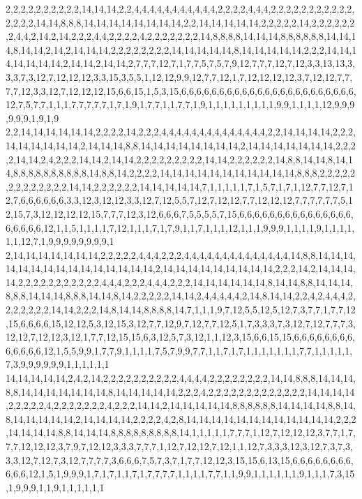 2,2,2,2,2,2,2,2,2,2,14,14,14,2,2,4,4,4,4,4,4,4,4,4,4,4,2,2,2,2,4,4,4,2,2,2,2,2,2,2,2,2,2,2,2,2,2,2,14,14,8,8,8,14,14,14,14,14,14,14,14,2,2,14,14,14,14,14,2,2,2,2,2,14,2,2,2,2,2,2,2,4,4,2,14,2,14,2,2,2,4,4,2,2,2,2,4,2,2,2,2,2,2,2,14,8,8,8,8,14,14,14,8,8,8,8,8,8,14,14,14,8,14,14,2,14,2,14,14,14,2,2,2,2,2,2,2,2,14,14,14,14,14,8,14,14,14,14,14,2,2,2,14,14,14,14,14,14,14,2,14,14,2,14,14,2,7,7,7,12,7,1,7,7,5,7,5,7,9,12,7,7,7,12,7,12,3,3,13,13,3,3,3,7,3,12,7,12,12,12,3,3,15,3,5,5,1,12,12,9,9,12,7,7,12,1,7,12,12,12,12,3,7,12,12,7,7,7,7,12,3,3,12,7,12,12,12,15,6,6,15,1,5,3,15,6,6,6,6,6,6,6,6,6,6,6,6,6,6,6,6,6,6,6,6,6,6,6,12,7,5,7,7,1,1,1,7,7,7,7,7,1,7,1,9,1,7,7,1,1,7,7,1,9,1,1,1,1,1,1,1,1,1,9,9,1,1,1,1,12,9,9,9,9,9,9,1,9,1,9
2,2,14,14,14,14,14,14,2,2,2,2,14,2,2,2,4,4,4,4,4,4,4,4,4,4,4,4,4,4,2,2,14,14,14,14,2,2,2,14,14,14,14,14,14,2,14,14,14,8,8,14,14,14,14,14,14,14,14,2,14,14,14,14,14,14,14,2,2,2,2,14,14,2,4,2,2,2,14,14,2,14,14,2,2,2,2,2,2,2,2,2,14,14,2,2,2,2,2,2,14,8,8,14,14,8,14,14,8,8,8,8,8,8,8,8,8,8,14,8,8,14,2,2,2,2,14,14,14,14,14,14,14,14,14,14,14,8,8,8,2,2,2,2,2,2,2,2,2,2,2,2,2,14,14,2,2,2,2,2,2,14,14,14,14,14,7,1,1,1,1,1,7,1,5,7,1,7,1,12,7,7,12,7,12,7,6,6,6,6,6,6,3,3,12,3,12,12,3,3,12,7,12,5,5,7,12,7,12,12,7,7,12,12,12,7,7,7,7,7,7,5,12,15,7,3,12,12,12,12,15,7,7,7,12,3,12,6,6,6,7,5,5,5,5,7,15,6,6,6,6,6,6,6,6,6,6,6,6,6,6,6,6,6,6,6,6,12,1,1,5,1,1,1,1,7,12,1,1,1,7,1,7,9,1,1,7,1,1,1,12,1,1,1,9,9,9,1,1,1,1,9,1,1,1,1,1,1,12,7,1,9,9,9,9,9,9,9,9,1
2,14,14,14,14,14,14,14,2,2,2,2,2,4,4,4,2,2,2,4,4,4,4,4,4,4,4,4,4,4,4,4,4,14,8,8,14,14,14,14,14,14,14,14,14,14,14,14,14,14,14,2,14,14,14,14,14,14,14,14,14,2,2,2,14,2,14,14,14,14,2,2,2,2,2,2,2,2,2,2,2,4,4,4,2,2,2,4,4,4,2,2,2,14,14,14,14,14,14,8,14,14,8,8,14,14,14,8,8,8,14,14,14,8,8,8,14,14,8,14,2,2,2,2,2,14,14,2,4,4,4,4,4,2,14,8,14,14,2,2,4,2,4,4,4,2,2,2,2,2,2,2,14,14,2,2,2,14,8,14,14,8,8,8,8,14,7,1,1,1,9,7,12,5,5,12,5,12,7,3,7,7,1,7,7,12,15,6,6,6,6,15,12,12,5,3,12,15,3,12,7,7,12,9,7,12,7,7,12,5,1,7,3,3,3,7,3,12,7,12,7,7,7,3,12,12,7,12,12,3,12,1,7,7,12,15,15,6,3,12,5,7,3,12,1,1,12,3,15,6,6,15,15,6,6,6,6,6,6,6,6,6,6,6,6,6,12,1,5,5,9,9,1,7,7,9,1,1,1,1,7,5,7,9,9,7,7,1,1,7,1,7,1,1,1,1,1,1,1,7,7,1,1,1,1,1,7,3,9,9,9,9,9,9,1,1,1,1,1,1
14,14,14,14,14,2,4,2,14,2,2,2,2,2,2,2,2,2,2,4,4,4,4,2,2,2,2,2,2,2,2,14,14,8,8,8,14,14,14,8,8,14,14,14,14,14,14,14,8,14,14,14,14,14,2,2,2,4,2,2,2,2,2,2,2,2,2,2,2,2,2,14,14,14,14,2,2,2,2,2,4,2,2,2,2,2,2,2,4,2,2,2,14,14,2,14,14,14,14,14,8,8,8,8,8,8,14,14,14,14,8,8,14,8,14,14,14,14,14,2,14,14,14,14,2,2,2,2,4,2,8,14,14,14,14,14,14,14,14,14,14,14,14,2,2,2,14,14,14,14,8,8,14,14,14,8,8,8,8,8,8,8,8,8,14,1,1,1,1,1,7,7,7,1,12,7,12,12,12,3,7,7,1,7,7,7,12,12,12,3,7,9,7,12,12,3,3,3,7,7,7,1,12,7,12,12,7,12,1,1,12,7,3,3,3,12,3,12,7,3,7,3,3,3,12,7,12,7,3,12,7,7,7,7,3,6,6,6,7,5,7,3,7,1,7,7,12,12,3,15,15,6,13,15,6,6,6,6,6,6,6,6,6,6,6,12,1,5,1,9,9,9,1,7,1,7,1,1,7,1,7,7,7,7,1,1,1,1,7,7,1,1,9,9,1,1,1,1,1,1,9,1,1,1,7,3,15,1,9,9,9,1,1,9,1,1,1,1,1,1

